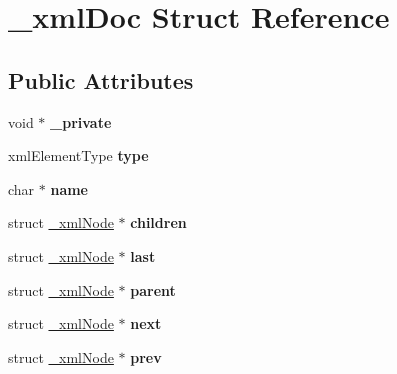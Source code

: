 \hypertarget{struct__xmlDoc}{
\section{\_\-xmlDoc Struct Reference}
\label{struct__xmlDoc}
}
\subsection*{Public Attributes}
\begin{DoxyCompactItemize}
\item 
\hypertarget{struct__xmlDoc_a50dd4d34840e069af0d520532ba3934b}{
void $\ast$ {\bfseries \_\-private}}
\label{struct__xmlDoc_a50dd4d34840e069af0d520532ba3934b}

\item 
\hypertarget{struct__xmlDoc_aef9fa638a443a4fba932853a17948709}{
xmlElementType {\bfseries type}}
\label{struct__xmlDoc_aef9fa638a443a4fba932853a17948709}

\item 
\hypertarget{struct__xmlDoc_a2548ebf8d04b23f6de8646769b05057d}{
char $\ast$ {\bfseries name}}
\label{struct__xmlDoc_a2548ebf8d04b23f6de8646769b05057d}

\item 
\hypertarget{struct__xmlDoc_ac7b84a52508e7ba5db5cdb28361bfcea}{
struct \hyperlink{struct__xmlNode}{\_\-xmlNode} $\ast$ {\bfseries children}}
\label{struct__xmlDoc_ac7b84a52508e7ba5db5cdb28361bfcea}

\item 
\hypertarget{struct__xmlDoc_a8b4685c311eaf949512c6580da728b91}{
struct \hyperlink{struct__xmlNode}{\_\-xmlNode} $\ast$ {\bfseries last}}
\label{struct__xmlDoc_a8b4685c311eaf949512c6580da728b91}

\item 
\hypertarget{struct__xmlDoc_a68684ddadacb0eadb84aaf64bed3c22d}{
struct \hyperlink{struct__xmlNode}{\_\-xmlNode} $\ast$ {\bfseries parent}}
\label{struct__xmlDoc_a68684ddadacb0eadb84aaf64bed3c22d}

\item 
\hypertarget{struct__xmlDoc_a12d4bfc0972dc7f9ba3a67f7c4b94aae}{
struct \hyperlink{struct__xmlNode}{\_\-xmlNode} $\ast$ {\bfseries next}}
\label{struct__xmlDoc_a12d4bfc0972dc7f9ba3a67f7c4b94aae}

\item 
\hypertarget{struct__xmlDoc_ab4895482a4c47ae0e40b7dfadce94f3d}{
struct \hyperlink{struct__xmlNode}{\_\-xmlNode} $\ast$ {\bfseries prev}}
\label{struct__xmlDoc_ab4895482a4c47ae0e40b7dfadce94f3d}


\end{DoxyCompactItemize}
